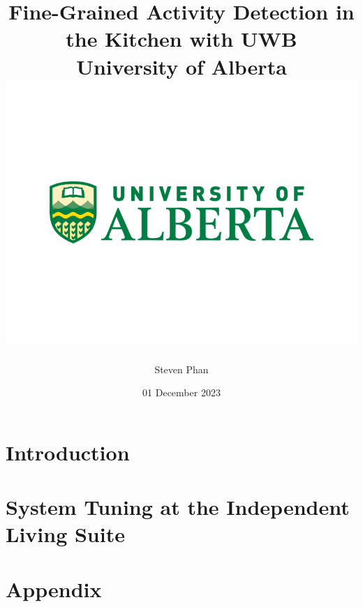 \documentclass[12pt]{report}
\title{
    {Fine-Grained Activity Detection in the Kitchen with UWB}\\
    {\large University of Alberta}\\
    {\includegraphics[width=\textwidth]{university.png}}
}
\author{Steven Phan}
\date{01 December 2023}
\begin{document}
\maketitle


\tableofcontents

\chapter{Introduction}


\chapter{System Tuning at the Independent Living Suite}


\appendix
\chapter{Appendix}





\end{document}
